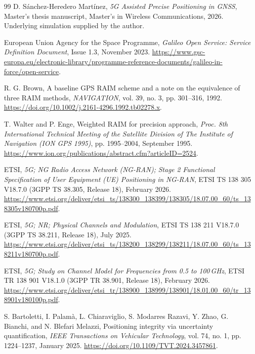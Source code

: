 \documentclass[pdflatex,sn-mathphys-num]{sn-jnl}
\begin{document}
\begin{thebibliography}{99}
D. S\'anchez-Heredero Mart\'inez,
\emph{5G Assisted Precise Positioning in GNSS},
Master's thesis manuscript, Master's in Wireless Communications,
2026. Underlying simulation supplied by the author.

European Union Agency for the Space Programme,
\emph{Galileo Open Service: Service Definition Document},
Issue 1.3, November 2023.
\url{https://www.gsc-europa.eu/electronic-library/programme-reference-documents/galileo-in-force/open-service}.

R. G. Brown, A baseline GPS RAIM scheme and a note on the equivalence
of three RAIM methods, \emph{NAVIGATION}, vol. 39, no. 3,
pp. 301--316, 1992.
\url{https://doi.org/10.1002/j.2161-4296.1992.tb02278.x}.

T. Walter and P. Enge, Weighted RAIM for precision approach,
\emph{Proc. 8th International Technical Meeting of the Satellite
Division of The Institute of Navigation (ION GPS 1995)},
pp. 1995--2004, September 1995.
\url{https://www.ion.org/publications/abstract.cfm?articleID=2524}.

ETSI, \emph{5G; NG Radio Access Network (NG-RAN); Stage 2
Functional Specification of User Equipment (UE) Positioning in NG-RAN},
ETSI TS 138 305 V18.7.0 (3GPP TS 38.305, Release 18), February 2026.
\url{https://www.etsi.org/deliver/etsi_ts/138300_138399/138305/18.07.00_60/ts_138305v180700p.pdf}.

ETSI, \emph{5G; NR; Physical Channels and Modulation},
ETSI TS 138 211 V18.7.0 (3GPP TS 38.211, Release 18), July 2025.
\url{https://www.etsi.org/deliver/etsi_ts/138200_138299/138211/18.07.00_60/ts_138211v180700p.pdf}.

ETSI, \emph{5G; Study on Channel Model for Frequencies from
0.5 to 100\,GHz}, ETSI TR 138 901 V18.1.0
(3GPP TR 38.901, Release 18), February 2026.
\url{https://www.etsi.org/deliver/etsi_tr/138900_138999/138901/18.01.00_60/tr_138901v180100p.pdf}.

S. Bartoletti, I. Palam\`a, L. Chiaraviglio, S. Modarres Razavi,
Y. Zhao, G. Bianchi, and N. Blefari Melazzi,
Positioning integrity via uncertainty quantification,
\emph{IEEE Transactions on Vehicular Technology},
vol. 74, no. 1, pp. 1224--1237, January 2025.
\url{https://doi.org/10.1109/TVT.2024.3457861}.
\end{thebibliography}
\end{document}
